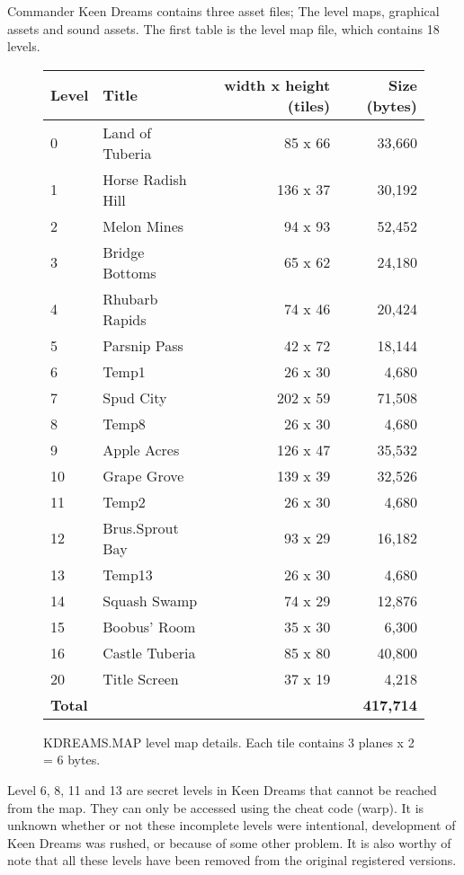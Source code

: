 \documentclass[book.tex]{subfiles}
\begin{document}
\label{asset_details}


Commander Keen Dreams contains three asset files; The level maps, graphical assets and sound assets. The first table is the level map file, which contains 18 levels.

\begin{figure}[H]
\centering
{\renewcommand{\arraystretch}{1.1} %
\begin{tabularx}{\textwidth}[c]{X X r r }
  \hline
  \textbf{Level} & \textbf{Title} & \textbf{width x height (tiles)} & \textbf{Size (bytes)}\\ \hline
	0 & Land of Tuberia & 85 x 66 &  33,660 \\
	1 & Horse Radish Hill & 136 x 37 &   30,192 \\ 
	2 & Melon Mines & 94 x 93 &   52,452 \\
	3 & Bridge Bottoms & 65 x 62 &  24,180 \\
	4 & Rhubarb Rapids & 74 x 46 &  20,424 \\
	5 & Parsnip Pass & 42 x 72 &   18,144 \\
	6 & Temp1 & 26 x 30 &   4,680 \\
	7 & Spud City & 202 x 59 &  71,508 \\
	8 & Temp8 & 26 x 30 &  4,680 \\
	9 & Apple Acres & 126 x 47 &  35,532 \\
	10 & Grape Grove & 139 x 39 &  32,526 \\
	11 & Temp2 & 26 x 30 &  4,680 \\
	12 & Brus.Sprout Bay & 93 x 29 &  16,182 \\
	13 & Temp13 & 26 x 30 &  4,680 \\
	14 & Squash Swamp & 74 x 29 &  12,876 \\
	15 & Boobus' Room & 35 x 30 &  6,300 \\
	16 & Castle Tuberia & 85 x 80 &  40,800 \\
	20 & Title Screen & 37 x 19 &  4,218 \\ \hline
	\textbf{Total} & \multicolumn{3}{r}{\textbf{417,714}} \\ \hline
\end{tabularx}
}
\caption{KDREAMS.MAP level map details. Each tile contains 3 planes x 2 = 6 bytes.}
\end{figure}

\par
Level 6, 8, 11 and 13 are secret levels in Keen Dreams that cannot be reached from the map. They can only be accessed using the cheat code  (warp). It is unknown whether or not these incomplete levels were intentional, development of Keen Dreams was rushed, or because of some other problem. It is also worthy of note that all these levels have been removed from the original registered versions.\\
\end{document}
